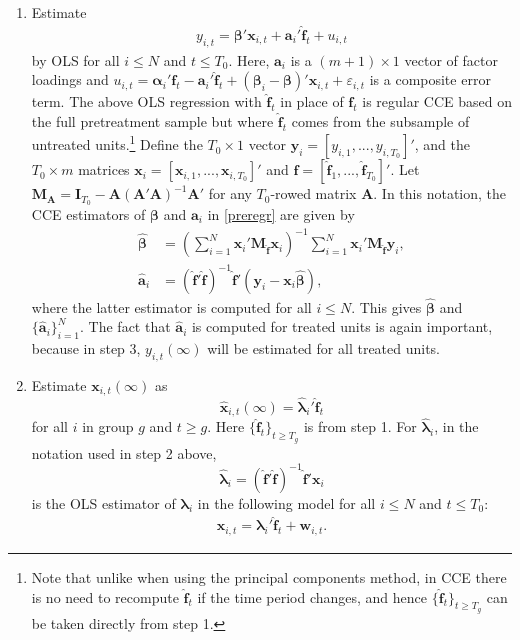 \documentclass[12pt,fleqn]{article}
\def\*#1{\mathbf{#1}}
\def\+#1{\boldsymbol{#1}}
\begin{document}
\begin{enumerate}
\item Estimate
\begin{align}
y_{i,t} = \+\beta'\*x_{i,t} + \*a_i'\widehat{\*f}_t + u_{i,t}\label{preregr}
\end{align}
by OLS for all $i \leq N$ and $t \leq T_0$. Here, $\*a_i$ is a $(m+1)\times 1$ vector of factor loadings and $u_{i,t} = \+\alpha_i'\*f_t - \*a_i'\widehat{\*f}_t + (\+\beta_i-\+\beta)'\*x_{i,t} +  \varepsilon_{i,t}$ is a composite error term. The above OLS regression with $\widehat{\*f}_t$ in place of $\*f_t$ is regular CCE based on the full pretreatment sample but where $\widehat{\*f}_t$ comes from the subsample of untreated units.\footnote{Note that unlike when using the principal components method, in CCE there is no need to recompute $\widehat{\*f}_t$ if the time period changes, and hence $\{\widehat{\*f}_t\}_{t \geq T_g}$ can be taken directly from step 1.} Define the $T_0\times 1$ vector $\*y_{i} = [y_{i,1},...,y_{i,T_0}]'$, and the $T_0\times m$ matrices $\*x_{i} = [\*x_{i,1},...,\*x_{i,T_0}]'$ and $\widehat{\*f} = [\widehat{\*f}_{1},...,\widehat{\*f}_{T_0}]'$. Let $\*M_{\*A} = \*I_{T_0} - \*A(\*A'\*A)^{-1}\*A'$ for any $T_0$-rowed matrix $\*A$. In this notation, the CCE estimators of $\+\beta$ and $\*a_i$ in \eqref{preregr} are given by
\begin{align}
\widehat{\+\beta} &= \left(\sum_{i=1}^N  \*x_{i}'\*M_{\widehat{\*f}}\*x_{i}\right)^{-1}\sum_{i=1}^N \*x_{i}' \*M_{\widehat{\*f}}\*y_{i},\\
\widehat{\*a}_i &= (\widehat{\*f}'\widehat{\*f})^{-1}\widehat{\*f}'(\*y_{i}-\*x_{i}\widehat{\+\beta}),
\end{align}
where the latter estimator is computed for all $i\leq N$. This gives $\widehat{\+\beta}$ and $\{\widehat{\*a}_i\}_{i=1}^N$. The fact that $\widehat{\*a}_i$ is computed for treated units is again important, because in step 3, $y_{i,t}(\infty)$ will be estimated for all treated units.

\item Estimate $\*x_{i,t}(\infty)$ as
\begin{equation}
    \widehat{\*x}_{i,t}(\infty) = \widehat{\+\lambda}_i'\widehat{\*f}_t
\end{equation}
for all $i$ in group $g$ and $t \geq g$. Here $\{\widehat{\*f}_t\}_{t \geq T_g}$ is from step 1. For $\widehat{\+\lambda}_i$, in the notation used in step 2 above,
\begin{equation}
\widehat{\+\lambda}_i = ( \widehat{\*f}' \widehat{\*f} )^{-1} \widehat{\*f}' \*x_i
\end{equation}
is the OLS estimator of $\+\lambda_i$ in the following model for all $i \leq N$ and $t \leq T_0$:
\begin{align}
\*x_{i,t} = \+\lambda_i'\widehat{\*f}_t + \*w_{i,t}.
\end{align}


\end{enumerate}
\end{document}
